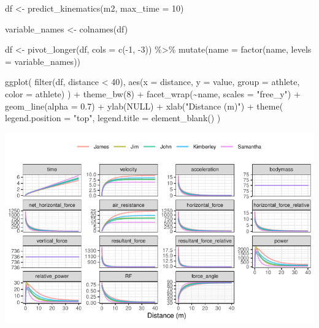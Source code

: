 \documentclass[fleqn,10pt]{wlpeerj} %
\newenvironment{Shaded}{\begin{snugshade}}{\end{snugshade}}
\newcommand{\AttributeTok}[1]{\textcolor[rgb]{0.77,0.63,0.00}{#1}}
\newcommand{\ConstantTok}[1]{\textcolor[rgb]{0.00,0.00,0.00}{#1}}
\newcommand{\DecValTok}[1]{\textcolor[rgb]{0.00,0.00,0.81}{#1}}
\newcommand{\FloatTok}[1]{\textcolor[rgb]{0.00,0.00,0.81}{#1}}
\newcommand{\FunctionTok}[1]{\textcolor[rgb]{0.00,0.00,0.00}{#1}}
\newcommand{\NormalTok}[1]{#1}
\newcommand{\OtherTok}[1]{\textcolor[rgb]{0.56,0.35,0.01}{#1}}
\newcommand{\SpecialCharTok}[1]{\textcolor[rgb]{0.00,0.00,0.00}{#1}}
\newcommand{\StringTok}[1]{\textcolor[rgb]{0.31,0.60,0.02}{#1}}
\begin{document}
\begin{Shaded}
\begin{Highlighting}[]
\NormalTok{df }\OtherTok{\textless{}{-}} \FunctionTok{predict\_kinematics}\NormalTok{(m2, }\AttributeTok{max\_time =} \DecValTok{10}\NormalTok{)}

\NormalTok{variable\_names }\OtherTok{\textless{}{-}} \FunctionTok{colnames}\NormalTok{(df)}

\NormalTok{df }\OtherTok{\textless{}{-}} \FunctionTok{pivot\_longer}\NormalTok{(df, }\AttributeTok{cols =} \FunctionTok{c}\NormalTok{(}\SpecialCharTok{{-}}\DecValTok{1}\NormalTok{, }\SpecialCharTok{{-}}\DecValTok{3}\NormalTok{)) }\SpecialCharTok{\%\textgreater{}\%}
  \FunctionTok{mutate}\NormalTok{(}\AttributeTok{name =} \FunctionTok{factor}\NormalTok{(name, }\AttributeTok{levels =}\NormalTok{ variable\_names))}

\FunctionTok{ggplot}\NormalTok{(}
  \FunctionTok{filter}\NormalTok{(df, distance }\SpecialCharTok{\textless{}} \DecValTok{40}\NormalTok{),}
  \FunctionTok{aes}\NormalTok{(}\AttributeTok{x =}\NormalTok{ distance, }\AttributeTok{y =}\NormalTok{ value, }\AttributeTok{group =}\NormalTok{ athlete, }\AttributeTok{color =}\NormalTok{ athlete)}
\NormalTok{) }\SpecialCharTok{+}
  \FunctionTok{theme\_bw}\NormalTok{(}\DecValTok{8}\NormalTok{) }\SpecialCharTok{+}
  \FunctionTok{facet\_wrap}\NormalTok{(}\SpecialCharTok{\textasciitilde{}}\NormalTok{name, }\AttributeTok{scales =} \StringTok{"free\_y"}\NormalTok{) }\SpecialCharTok{+}
  \FunctionTok{geom\_line}\NormalTok{(}\AttributeTok{alpha =} \FloatTok{0.7}\NormalTok{) }\SpecialCharTok{+}
  \FunctionTok{ylab}\NormalTok{(}\ConstantTok{NULL}\NormalTok{) }\SpecialCharTok{+}
  \FunctionTok{xlab}\NormalTok{(}\StringTok{"Distance (m)"}\NormalTok{) }\SpecialCharTok{+}
  \FunctionTok{theme}\NormalTok{(}
    \AttributeTok{legend.position =} \StringTok{"top"}\NormalTok{,}
    \AttributeTok{legend.title =} \FunctionTok{element\_blank}\NormalTok{()}
\NormalTok{  )}
\end{Highlighting}
\end{Shaded}

\begin{center}\includegraphics[width=0.9\linewidth]{paper_files/figure-latex/unnamed-chunk-12-1} \end{center}
\end{document}
